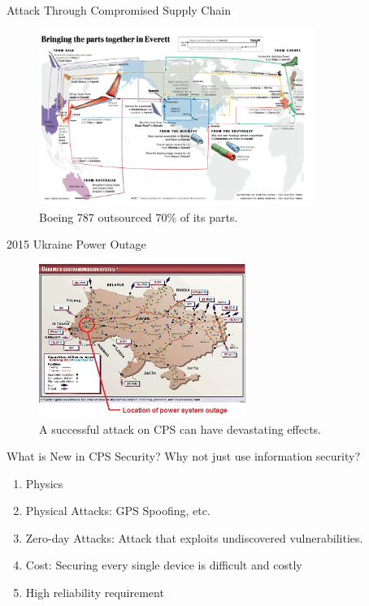 \documentclass[10pt]{beamer}
\begin{document}
\begin{frame}{Attack Through Compromised Supply Chain}
  \begin{figure}[ht]
    \centering
    \includegraphics[width=0.8\textwidth]{boeing.jpg}
    \caption{Boeing 787 outsourced 70\% of its parts.}
  \end{figure}
\end{frame}

\begin{frame}{2015 Ukraine Power Outage}
  \begin{figure}[<+htpb+>]
    \begin{center}
      \includegraphics[width=0.60\textwidth]{ukraine.jpg}
      \caption{A successful attack on CPS can have devastating effects.}
    \end{center}
  \end{figure}
\end{frame}

\begin{frame}{What is New in CPS Security?}
  Why not just use information security?
  \begin{enumerate}
  \item Physics
  \item Physical Attacks: GPS Spoofing, etc.
  \item Zero-day Attacks: Attack that exploits undiscovered vulnerabilities.
  \item Cost: Securing every single device is difficult and costly
  \item High reliability requirement
  \end{enumerate}
\end{frame}
\end{document}
